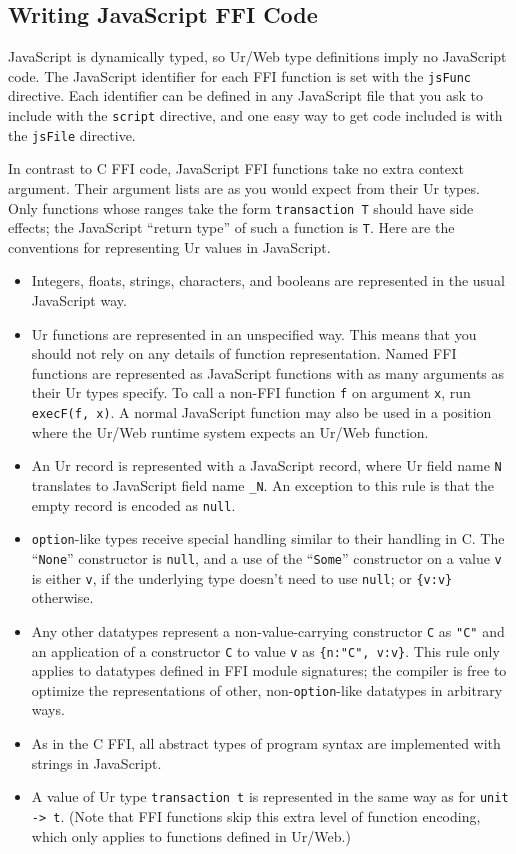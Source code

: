 \documentclass{article}
\begin{document}
\subsection{Writing JavaScript FFI Code}

JavaScript is dynamically typed, so Ur/Web type definitions imply no JavaScript code.  The JavaScript identifier for each FFI function is set with the \texttt{jsFunc} directive.  Each identifier can be defined in any JavaScript file that you ask to include with the \texttt{script} directive, and one easy way to get code included is with the \texttt{jsFile} directive.

In contrast to C FFI code, JavaScript FFI functions take no extra context argument.  Their argument lists are as you would expect from their Ur types.  Only functions whose ranges take the form \texttt{transaction T} should have side effects; the JavaScript ``return type'' of such a function is \texttt{T}.  Here are the conventions for representing Ur values in JavaScript.

\begin{itemize}
\item Integers, floats, strings, characters, and booleans are represented in the usual JavaScript way.
\item Ur functions are represented in an unspecified way.  This means that you should not rely on any details of function representation.  Named FFI functions are represented as JavaScript functions with as many arguments as their Ur types specify.  To call a non-FFI function \texttt{f} on argument \texttt{x}, run \texttt{execF(f, x)}.  A normal JavaScript function may also be used in a position where the Ur/Web runtime system expects an Ur/Web function.
\item An Ur record is represented with a JavaScript record, where Ur field name \texttt{N} translates to JavaScript field name \texttt{\_N}.  An exception to this rule is that the empty record is encoded as \texttt{null}.
\item \texttt{option}-like types receive special handling similar to their handling in C.  The ``\texttt{None}'' constructor is \texttt{null}, and a use of the ``\texttt{Some}'' constructor on a value \texttt{v} is either \texttt{v}, if the underlying type doesn't need to use \texttt{null}; or \texttt{\{v:v\}} otherwise.
\item Any other datatypes represent a non-value-carrying constructor \texttt{C} as \texttt{"C"} and an application of a constructor \texttt{C} to value \texttt{v} as \texttt{\{n:"C", v:v\}}.  This rule only applies to datatypes defined in FFI module signatures; the compiler is free to optimize the representations of other, non-\texttt{option}-like datatypes in arbitrary ways.
\item As in the C FFI, all abstract types of program syntax are implemented with strings in JavaScript.
\item A value of Ur type \texttt{transaction t} is represented in the same way as for \texttt{unit -> t}.  (Note that FFI functions skip this extra level of function encoding, which only applies to functions defined in Ur/Web.)
\end{itemize}
\end{document}
